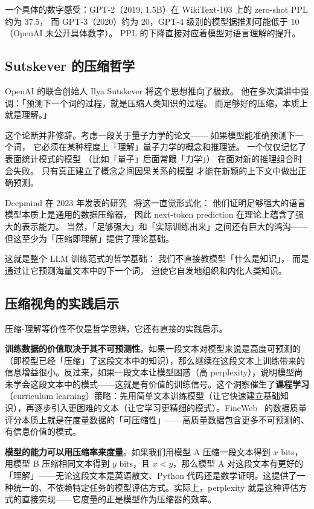 一个具体的数字感受：GPT-2（2019, 1.5B）在 WikiText-103 上的 zero-shot PPL 约为 37.5，
而 GPT-3（2020）约为 20，GPT-4 级别的模型据推测可能低于 10（OpenAI 未公开具体数字）。
PPL 的下降直接对应着模型对语言理解的提升。

\subsection{Sutskever 的压缩哲学}

OpenAI 的联合创始人 Ilya Sutskever 将这个思想推向了极致。
他在多次演讲中强调：「预测下一个词的过程，就是压缩人类知识的过程。
而足够好的压缩，本质上就是理解。」

这个论断并非修辞。考虑一段关于量子力学的论文——
如果模型能准确预测下一个词，
它必须在某种程度上「理解」量子力学的概念和推理链。
一个仅仅记忆了表面统计模式的模型
（比如「量子」后面常跟「力学」）
在面对新的推理组合时会失败。
只有真正建立了概念之间因果关系的模型
才能在新颖的上下文中做出正确预测。

Deepmind 在 2023 年发表的研究~\cite{deletang2024language}
将这一直觉形式化：
他们证明足够强大的语言模型本质上是通用的数据压缩器，
因此 next-token prediction 在理论上蕴含了强大的表示能力。
当然，「足够强大」和「实际训练出来」之间还有巨大的鸿沟——
但这至少为「压缩即理解」提供了理论基础。

这就是整个 LLM 训练范式的哲学基础：
我们不直接教模型「什么是知识」，
而是通过让它预测海量文本中的下一个词，
迫使它自发地组织和内化人类知识。

\subsection{压缩视角的实践启示}

压缩-理解等价性不仅是哲学思辨，它还有直接的实践启示。

\textbf{训练数据的价值取决于其不可预测性}。如果一段文本对模型来说是高度可预测的（即模型已经「压缩」了这段文本中的知识），那么继续在这段文本上训练带来的信息增益很小。反过来，如果一段文本让模型困惑（高 perplexity），说明模型尚未学会这段文本中的模式——这就是有价值的训练信号。这个洞察催生了\textbf{课程学习}（curriculum learning）策略：先用简单文本训练模型（让它快速建立基础知识），再逐步引入更困难的文本（让它学习更精细的模式）。FineWeb~\cite{penedo2024fineweb} 的数据质量评分本质上就是在度量数据的「可压缩性」——高质量数据包含更多不可预测的、有信息价值的模式。

\textbf{模型的能力可以用压缩率来度量}。如果我们用模型 A 压缩一段文本得到 $x$ bits，用模型 B 压缩相同文本得到 $y$ bits，且 $x < y$，那么模型 A 对这段文本有更好的「理解」——无论这段文本是英语散文、Python 代码还是数学证明。这提供了一种统一的、不依赖特定任务的模型评估方式。实际上，perplexity 就是这种评估方式的直接实现——它度量的正是模型作为压缩器的效率。

